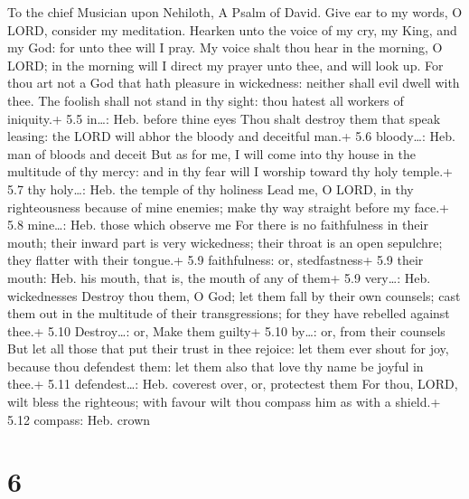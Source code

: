 To the chief Musician upon Nehiloth, A Psalm of David.  Give
ear to my words, O LORD, consider my meditation.  Hearken
unto the voice of my cry, my King, and my God: for unto thee will I
pray.  My voice shalt thou hear in the morning, O LORD; in
the morning will I direct my prayer unto thee, and will look up.
 For thou art not a God that hath pleasure in wickedness:
neither shall evil dwell with thee.  The foolish shall not
stand in thy sight: thou hatest all workers of iniquity.+ 5.5 in\ldots:
Heb. before thine eyes  Thou shalt destroy them that speak
leasing: the LORD will abhor the bloody and deceitful man.+ 5.6
bloody\ldots: Heb. man of bloods and deceit  But as for me,
I will come into thy house in the multitude of thy mercy: and in thy
fear will I worship toward thy holy temple.+ 5.7 thy holy\ldots: Heb.
the temple of thy holiness  Lead me, O LORD, in thy
righteousness because of mine enemies; make thy way straight before my
face.+ 5.8 mine\ldots: Heb. those which observe me  For
there is no faithfulness in their mouth; their inward part is very
wickedness; their throat is an open sepulchre; they flatter with their
tongue.+ 5.9 faithfulness: or, stedfastness+ 5.9 their mouth: Heb. his
mouth, that is, the mouth of any of them+ 5.9 very\ldots: Heb.
wickednesses  Destroy thou them, O God; let them fall by
their own counsels; cast them out in the multitude of their
transgressions; for they have rebelled against thee.+ 5.10
Destroy\ldots: or, Make them guilty+ 5.10 by\ldots: or, from their
counsels  But let all those that put their trust in thee
rejoice: let them ever shout for joy, because thou defendest them: let
them also that love thy name be joyful in thee.+ 5.11 defendest\ldots:
Heb. coverest over, or, protectest them  For thou, LORD,
wilt bless the righteous; with favour wilt thou compass him as with a
shield.+ 5.12 compass: Heb. crown

\hypertarget{section-5}{%
\section{6}\label{section-5}}

